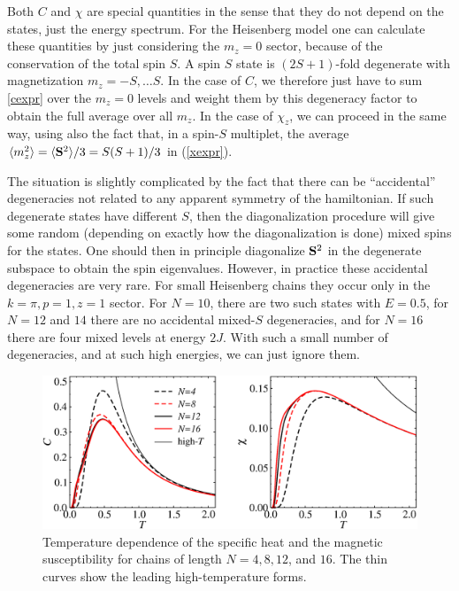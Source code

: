 \documentclass[draft,numberedheadings]{aipproc}
\begin{document}
Both $C$ and $\chi$ are special quantities in the sense that they do not depend on the states, just the energy spectrum. For the Heisenberg model
one can calculate these quantities by just considering the $m_z=0$ sector, because of the conservation of the total spin $S$. A spin $S$ state is 
$(2S+1)$-fold degenerate with magnetization $m_z=-S,\ldots S$. In the case of $C$, we therefore just have to sum \ref{cexpr} over the $m_z=0$ 
levels and weight them by this degeneracy factor to obtain the full average over all $m_z$. In the case of $\chi_z$, we can proceed in the same way, 
using also the fact that, in a spin-$S$ multiplet, the average $\langle m_z^2\rangle=\langle {\bf S}^2\rangle/3=S(S+1)/3$  in (\ref{xexpr}). 

The situation is slightly complicated by the fact that there can be ``accidental'' degeneracies not related to any apparent symmetry of the hamiltonian. 
If such degenerate states have different $S$, then the diagonalization procedure will give some random (depending on exactly how the diagonalization 
is done) mixed spins for the states. One should then in principle diagonalize ${\bf S}^2$ in the degenerate subspace to obtain the spin eigenvalues.
However, in practice these accidental degeneracies are very rare. For small Heisenberg chains they occur only in the $k=\pi,p=1,z=1$ sector. For $N=10$, 
there are two such states with $E=0.5$, for $N=12$ and $14$ there are no accidental mixed-$S$ degeneracies, and for $N=16$ there are four mixed levels at 
energy $2J$. With such a small number of degeneracies, and at such high energies, we can just ignore them. 

\begin{figure}
\includegraphics[width=11.5cm, clip]{cx.eps}
\caption{Temperature dependence of the specific heat and the magnetic susceptibility for chains of
length $N=4,8,12$, and $16$. The thin curves show the leading high-temperature forms.} 
\label{cx}
\end{figure}
\end{document}
